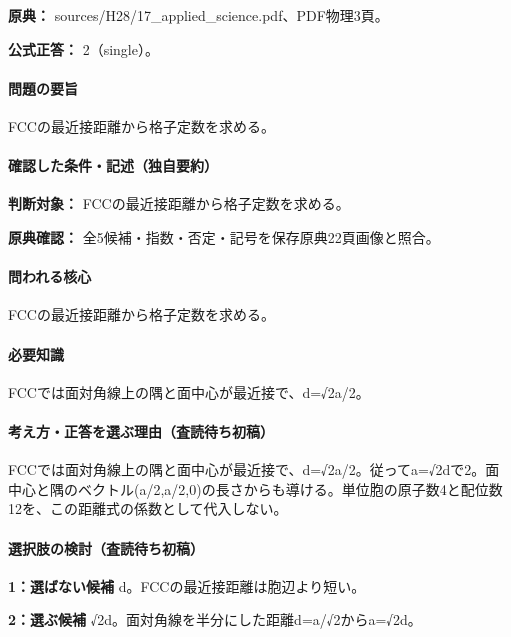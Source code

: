 \noindent\textbf{原典：} sources/H28/17\_applied\_science.pdf、PDF物理3頁。

\textbf{公式正答：} 2（single）。

\paragraph{問題の要旨} FCCの最近接距離から格子定数を求める。

\paragraph{確認した条件・記述（独自要約）}\mbox{}\par

\noindent\textbf{判断対象：} FCCの最近接距離から格子定数を求める。\par

\noindent\textbf{原典確認：} 全5候補・指数・否定・記号を保存原典22頁画像と照合。\par

\paragraph{問われる核心} FCCの最近接距離から格子定数を求める。

\paragraph{必要知識} FCCでは面対角線上の隅と面中心が最近接で、d=√2a/2。

\paragraph{考え方・正答を選ぶ理由（査読待ち初稿）} FCCでは面対角線上の隅と面中心が最近接で、d=√2a/2。従ってa=√2dで2。面中心と隅のベクトル(a/2,a/2,0)の長さからも導ける。単位胞の原子数4と配位数12を、この距離式の係数として代入しない。

\paragraph{選択肢の検討（査読待ち初稿）}\mbox{}\par

\noindent\textbf{1：選ばない候補} d。FCCの最近接距離は胞辺より短い。\par

\noindent\textbf{2：選ぶ候補} √2d。面対角線を半分にした距離d=\allowbreak{}a/√2からa=√2d。\par

